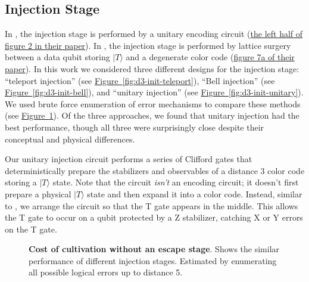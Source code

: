 \documentclass[onecolumn,unpublished,a4paper]{quantumarticle}
\theoremstyle{definition}
\newcommand{\fig}[1]{\hyperref[fig:#1]{Figure~\ref*{fig:#1}}}
\begin{document}
\subsection{Injection Stage}

In \cite{itogawa2024zeroleveldistilldistill}, the injection stage is performed by a unitary encoding circuit (\href{
    https://arxiv.org/pdf/2403.03991v1#page=2
}{the left half of figure 2 in their paper}).
In \cite{chamberland2020colorinjection}, the injection stage is performed by lattice surgery between a data qubit storing $|T\rangle$ and a degenerate color code (\href{
    https://www.nature.com/articles/s41534-020-00319-5/figures/7
}{figure 7a of their paper}).
In this work we considered three different designs for the injection stage: ``teleport injection'' (see \fig{d3-init-teleport}), ``Bell injection'' (see \fig{d3-init-bell}), and ``unitary injection'' (see \fig{d3-init-unitary}).
We used brute force enumeration of error mechanisms to compare these methods (see \fig{inject-only-enumerated}).
Of the three approaches, we found that unitary injection had the best performance, though all three were surprisingly close despite their conceptual and physical differences.

Our unitary injection circuit performs a series of Clifford gates that deterministically prepare the stabilizers and observables of a distance 3 color code storing a $|T\rangle$ state.
Note that the circuit \emph{isn't} an encoding circuit; it doesn't first prepare a physical $|T\rangle$ state and then expand it into a color code.
Instead, similar to \cite{gidney2023hook}, we arrange the circuit so that the T gate appears in the middle.
This allows the T gate to occur on a qubit protected by a Z stabilizer, catching X or Y errors on the T gate.

\begin{figure}
    \begin{adjustwidth}{-2.5cm}{-2.5cm}
        \centering
    \end{adjustwidth}
    \caption{
        \textbf{Cost of cultivation without an escape stage}.
        Shows the similar performance of different injection stages.
        Estimated by enumerating all possible logical errors up to distance 5.
    }
    \label{fig:inject-only-enumerated}
\end{figure}
\end{document}
